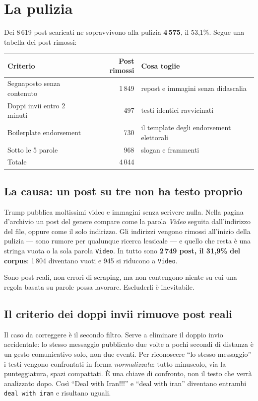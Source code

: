 \documentclass[11pt,a4paper]{article}
\begin{document}
\section{La pulizia}

Dei 8\,619 post scaricati ne sopravvivono alla pulizia \textbf{4\,575}, il
53,1\%. 
Segue una tabella dei post rimossi:
\begin{center}
\begin{tabular}{lrl}
\toprule
Criterio & Post rimossi & Cosa toglie \\
\midrule
Segnaposto senza contenuto & 1\,849 & repost e immagini senza didascalia \\
Doppi invii entro 2 minuti &   497  & testi identici ravvicinati \\
Boilerplate endorsement    &   730  & il template degli endorsement elettorali \\
Sotto le 5 parole          &   968  & slogan e frammenti \\
\midrule
Totale                     & 4\,044 & \\
\bottomrule
\end{tabular}
\end{center}

\subsection*{La causa: un post su tre non ha testo proprio}

Trump pubblica moltissimi video e immagini senza scrivere nulla. Nella pagina
d'archivio un post del genere compare come la parola \emph{Video} seguita
dall'indirizzo del file, oppure come il solo indirizzo. Gli indirizzi vengono
rimossi all'inizio della pulizia — sono rumore per qualunque ricerca
lessicale — e quello che resta è una stringa vuota o la sola parola
\texttt{Video}. In tutto sono \textbf{2\,749 post, il 31,9\% del corpus}:
1\,804 diventano vuoti e 945 si riducono a \texttt{Video}.

Sono post reali, non errori di scraping, ma non contengono niente su cui una
regola basata su parole possa lavorare. Escluderli è inevitabile. 
\subsection*{Il criterio dei doppi invii rimuove post reali}

Il caso da correggere è il secondo filtro. Serve a eliminare il doppio invio
accidentale: lo stesso messaggio pubblicato due volte a pochi secondi di
distanza è un gesto comunicativo solo, non due eventi. Per riconoscere ``lo
stesso messaggio'' i testi vengono confrontati in forma \emph{normalizzata}:
tutto minuscolo, via la punteggiatura, spazi compattati. È una chiave di
confronto, non il testo che verrà analizzato dopo. Così ``Deal with Iran!!!''
e ``deal with iran'' diventano entrambi \texttt{deal with iran} e risultano
uguali.
\end{document}
